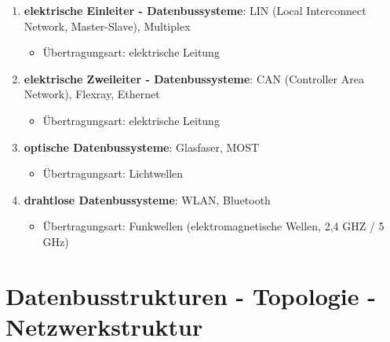 \begin{enumerate}
\item
  \textbf{elektrische Einleiter - Datenbussysteme}: LIN (Local
  Interconnect Network, Master-Slave), Multiplex

  \begin{itemize}
  \item
    Übertragungsart: elektrische Leitung
  \end{itemize}
\item
  \textbf{elektrische Zweileiter - Datenbussysteme}: CAN (Controller
  Area Network), Flexray, Ethernet

  \begin{itemize}
  \item
    Übertragungsart: elektrische Leitung
  \end{itemize}
\item
  \textbf{optische Datenbussysteme}: Glasfaser, MOST

  \begin{itemize}
  \item
    Übertragungsart: Lichtwellen
  \end{itemize}
\item
  \textbf{drahtlose Datenbussysteme}: WLAN, Bluetooth

  \begin{itemize}
  \item
    Übertragungsart: Funkwellen (elektromagnetische Wellen, 2,4 GHZ / 5
    GHz)
  \end{itemize}
\end{enumerate}

\newpage

\section{Datenbusstrukturen - Topologie -
Netzwerkstruktur}\label{datenbusstrukturen-topologie-netzwerkstruktur}

